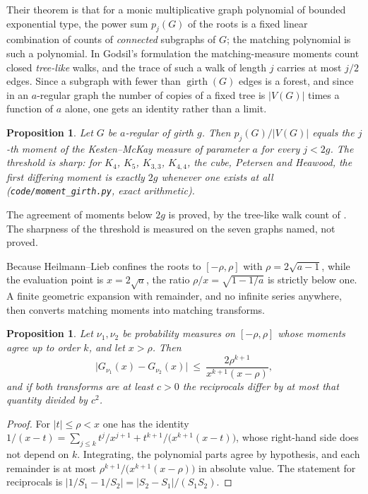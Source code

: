 \documentclass[11pt]{article}
\newtheorem{proposition}[theorem]{Proposition}
\theoremstyle{remark}
\begin{document}
Their theorem is that for a monic multiplicative graph polynomial of bounded exponential
type, the power sum $p_j(G)$ of the roots is a fixed linear combination of counts of
\emph{connected} subgraphs of $G$; the matching polynomial is such a polynomial. In
Godsil's formulation \cite{Go} the matching-measure moments count closed \emph{tree-like}
walks, and the trace of such a walk of length $j$ carries at most $j/2$ edges. Since a
subgraph with fewer than $\operatorname{girth}(G)$ edges is a forest, and since in an
$a$-regular graph the number of copies of a fixed tree is $|V(G)|$ times a function of $a$
alone, one gets an identity rather than a limit.

\begin{proposition}\label{prop:km-moments}
Let $G$ be $a$-regular of girth $g$. Then $p_j(G)/|V(G)|$ equals the $j$-th moment of the
Kesten--McKay measure of parameter $a$ for every $j<2g$. The threshold is sharp: for
$K_4$, $K_5$, $K_{3,3}$, $K_{4,4}$, the cube, Petersen and Heawood, the first differing
moment is exactly $2g$ whenever one exists at all
\textup{(}\texttt{code/moment\_girth.py}, exact arithmetic\textup{)}.
\end{proposition}

The agreement of moments below $2g$ is proved, by the tree-like walk count of \cite{Go}. The
sharpness of the threshold is measured on the seven graphs named, not proved.

Because Heilmann--Lieb confines the roots to $[-\rho,\rho]$ with $\rho=2\sqrt{a-1}$, while
the evaluation point is $x=2\sqrt a$, the ratio $\rho/x=\sqrt{1-1/a}$ is strictly below
one. A finite geometric expansion with remainder, and no infinite series anywhere, then
converts matching moments into matching transforms.

\begin{proposition}\label{prop:transfer}
Let $\nu_1,\nu_2$ be probability measures on $[-\rho,\rho]$ whose moments agree up to order
$k$, and let $x>\rho$. Then
\[
\bigl|G_{\nu_1}(x)-G_{\nu_2}(x)\bigr|\ \le\ \frac{2\rho^{k+1}}{x^{k+1}(x-\rho)},
\]
and if both transforms are at least $c>0$ the reciprocals differ by at most that quantity
divided by $c^2$.
\end{proposition}

\begin{proof}
For $|t|\le\rho<x$ one has the identity
$1/(x-t)=\sum_{j\le k}t^j/x^{j+1}+t^{k+1}/\bigl(x^{k+1}(x-t)\bigr)$, whose right-hand side
does not depend on $k$. Integrating, the polynomial parts agree by hypothesis, and each
remainder is at most $\rho^{k+1}/\bigl(x^{k+1}(x-\rho)\bigr)$ in absolute value. The
statement for reciprocals is $|1/S_1-1/S_2|=|S_2-S_1|/(S_1S_2)$.
\end{proof}
\end{document}
